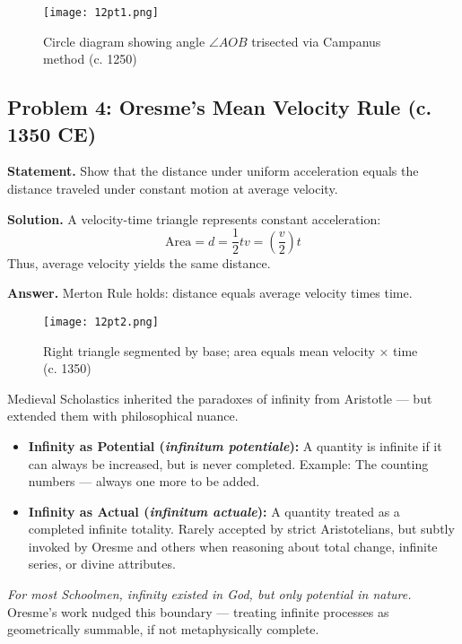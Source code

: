 \documentclass[9pt]{article}
\begin{document}
\begin{figure}[H]
\centering
\texttt{[image: 12pt1.png]}
\caption{Circle diagram showing angle \( \angle AOB \) trisected via Campanus method (c. 1250)}
\end{figure}

\newpage

\subsection*{Problem 4: Oresme’s Mean Velocity Rule (c. 1350 CE)}

\textbf{Statement.} Show that the distance under uniform acceleration equals the distance traveled under constant motion at average velocity.

\textbf{Solution.} A velocity-time triangle represents constant acceleration:
\[
\text{Area} = d = \frac{1}{2}tv = \left( \frac{v}{2} \right)t
\]
Thus, average velocity yields the same distance.

\textbf{Answer.} Merton Rule holds: distance equals average velocity times time.

\begin{figure}[H]
\centering
\texttt{[image: 12pt2.png]}
\caption{Right triangle segmented by base; area equals mean velocity × time (c. 1350)}
\end{figure}

\begin{tcolorbox}[colback=gray!5!white,colframe=black!75!white,title=Scholastic Note: Infinity as Potential and Actual]

Medieval Scholastics inherited the paradoxes of infinity from Aristotle — but extended them with philosophical nuance.

\begin{itemize}
    \item \textbf{Infinity as Potential (\textit{infinitum potentiale}):}  
    A quantity is infinite if it can always be increased, but is never completed.  
    Example: The counting numbers — always one more to be added.

    \item \textbf{Infinity as Actual (\textit{infinitum actuale}):}  
    A quantity treated as a completed infinite totality.  
    Rarely accepted by strict Aristotelians, but subtly invoked by Oresme and others when reasoning about total change, infinite series, or divine attributes.
\end{itemize}

\textit{For most Schoolmen, infinity existed in God, but only potential in nature.}  
Oresme’s work nudged this boundary — treating infinite processes as geometrically summable, if not metaphysically complete.

\end{tcolorbox}
\end{document}
